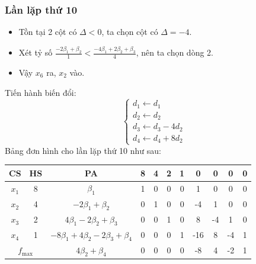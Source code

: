 \documentclass[12pt]{article}
\begin{document}
\subsubsection{Lần lặp thứ 10}
\begin{itemize}
\item Tồn tại 2 cột có $\Delta < 0$, ta chọn cột có $\Delta = -4$.
\item Xét tỷ số $\displaystyle \frac{-2\beta_1 + \beta_2}{1} < \frac{-4\beta_1 + 2\beta_2 + \beta_3}{4}$, nên ta chọn dòng 2.
\item Vậy $x_6$ ra, $x_2$ vào.
\end{itemize}
Tiến hành biến đổi:
$$
\left\{
\begin{array}{lll}
d_1 \leftarrow d_1 \\
d_2 \leftarrow d_2\\
d_3 \leftarrow d_3 - 4d_2\\
d_4 \leftarrow d_4 + 8d_2
\end{array}
\right.
$$
Bảng đơn hình cho lần lặp thứ 10 như sau:
\begin{table}[H]
\centering
\begin{tabular}{|c|c|c|c|c|c|c|c|c|c|c|}
\hline
CS & HS & PA & 8 & 4 & 2 & 1 & 0 & 0 & 0 & 0 \\
\hline
$x_1$ & 8 & $\beta_1$ & 1 & 0 & 0 & 0 & 1 & 0 & 0 & 0 \\
$x_2$ & 4 & $-2\beta_1 + \beta_2$ & 0 & 1 & 0 & 0 & -4 & 1 & 0 & 0 \\
$x_3$ & 2 & $4\beta_1 - 2\beta_2 + \beta_3$ & 0 & 0 & 1 & 0 & 8 & -4 & 1 & 0 \\
$x_4$ & 1 & $-8\beta_1 + 4\beta_2 - 2\beta_3 + \beta_4$ & 0 & 0 & 0 & 1 & -16 & 8 & -4 & 1 \\
\hline
\multicolumn{2}{|c|}{$f_{\max}$}
& $4\beta_2 + \beta_4$ & 0 & 0 & 0 & 0 & -8 & 4 & -2 & 1 \\
\hline
\end{tabular}
\end{table}
\end{document}
